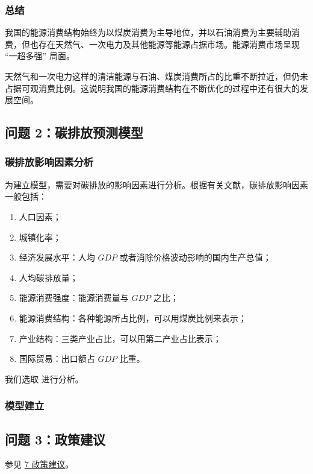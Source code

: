     \subsubsection{总结}
    我国的能源消费结构始终为以煤炭消费为主导地位，并以石油消费为主要辅助消费，但也存在天然气、一次电力及其他能源等能源占据市场。能源消费市场呈现 “一超多强” 局面。
    
    天然气和一次电力这样的清洁能源与石油、煤炭消费所占的比重不断拉近，但仍未占据可观消费比例。这说明我国的能源消费结构在不断优化的过程中还有很大的发展空间。

  \subsection{问题 2：碳排放预测模型}

    \subsubsection{碳排放影响因素分析}
      为建立模型，需要对碳排放的影响因素进行分析。根据有关文献，碳排放影响因素一般包括：
      \begin{enumerate}
        \item 人口因素；
        \item 城镇化率；
        \item 经济发展水平：人均 $GDP$ 或者消除价格波动影响的国内生产总值；
        \item 人均碳排放量；
        \item 能源消费强度：能源消费量与 $GDP$ 之比；
        \item 能源消费结构：各种能源所占比例，可以用煤炭比例来表示；
        \item 产业结构：三类产业占比，可以用第二产业占比表示；
        \item 国际贸易：出口额占 $GDP$ 比重。
      \end{enumerate}
      我们选取%
      进行分析。
    
    \subsubsection{模型建立}

  \subsection{问题 3：政策建议}
    参见 \hyperref[sec:zhencejianyi]{7 政策建议}。